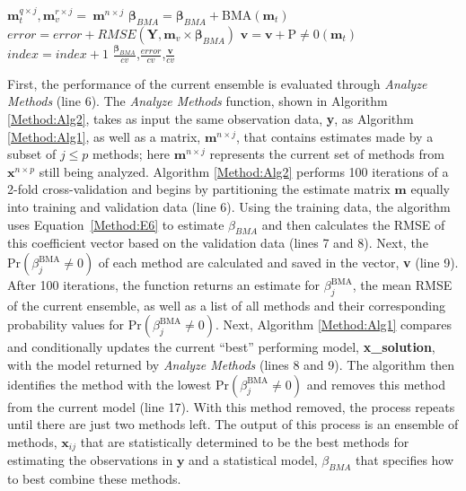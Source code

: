 \documentclass[journal=jpcbfk, manuscript=article]{achemso}
\newcommand{\+}[1]{\ensuremath{\mathbf{#1}}}
\begin{document}
\begin{table}[t]
\begin{minipage}[t]{0.45\linewidth}
\begin{algorithm}[H]
\begin{algorithmic}[1]
{				\; 
					\STATE $\textbf{m}_{t}^{q \times j}, \textbf{m}_{v}^{r \times j} =\ \textbf{m}^{n \times j}$\;
					\; 
					\STATE $\boldsymbol{\beta}_{BMA} = \boldsymbol{\beta}_{BMA} + $BMA$(\textbf{m}_{t})$ \; 
					\STATE $error = error + RMSE(\textbf{Y}, \textbf{m}_{v} \times \boldsymbol{\beta}_{BMA})$\; 
					\STATE $\textbf{v} = \textbf{v} + $P$\neq$0$(\textbf{m}_{t})$ \; 
					\STATE $index = index + 1$ 
				\ENDWHILE\; 
				\RETURN $\frac{\boldsymbol{\beta}_{BMA}}{cv}$,$\frac{error}{cv}$,$\frac{\textbf{v}}{cv}$\; } 
			\end{algorithmic}
		\end{algorithm} 
	\end{minipage}
\end{table}

First, the performance of the current ensemble is evaluated through \emph{Analyze Methods} (line 6).
The \emph{Analyze Methods} function, shown in Algorithm \ref{Method:Alg2}, takes as input the same observation data, \textbf{y}, as Algorithm \ref{Method:Alg1}, as well as a matrix,  $\textbf{m}^{n \times j}$, that contains estimates made by a subset of $j \leq p$ methods; here $\textbf{m}^{n \times j}$ represents the current set of methods from $\textbf{x}^{n \times p}$ still being analyzed.
Algorithm \ref{Method:Alg2} performs 100 iterations of a 2-fold cross-validation and begins by partitioning the estimate matrix $\mathbf{m}$ equally into training and validation data (line 6).
Using the training data, the algorithm uses Equation~\ref{Method:E6} to estimate $\beta_{BMA}$ and then calculates the RMSE of this coefficient vector based on the validation data (lines 7 and 8).
Next, the $\mathrm{Pr}(\beta_j^{\text{BMA}}\neq 0)$ of each method are calculated and saved in the vector, \textbf{v} (line 9).
After 100 iterations, the function returns an estimate for $\beta_j^{\text{BMA}}$, the mean RMSE of the current ensemble, as well as a list of all methods and their corresponding probability values for $\mathrm{Pr}(\beta_j^{\text{BMA}}\neq 0)$. 
Next, Algorithm \ref{Method:Alg1} compares and conditionally updates the current ``best'' performing model, \textbf{x\_solution}, with the model returned by \emph{Analyze Methods} (lines 8 and 9).
The algorithm then identifies the method with the lowest $\mathrm{Pr} (\beta_j^{\text{BMA}}\neq 0)$ and removes this method from the current model (line 17). With this method removed, the process repeats until there are just two methods left.
The output of this process is an ensemble of methods, $\textbf{x}_{ij}$ that are statistically determined to be the best methods for estimating the observations in $\mathbf{y}$ and a statistical model, $\beta_{BMA}$ that specifies how to best combine these methods.  
\end{document}
